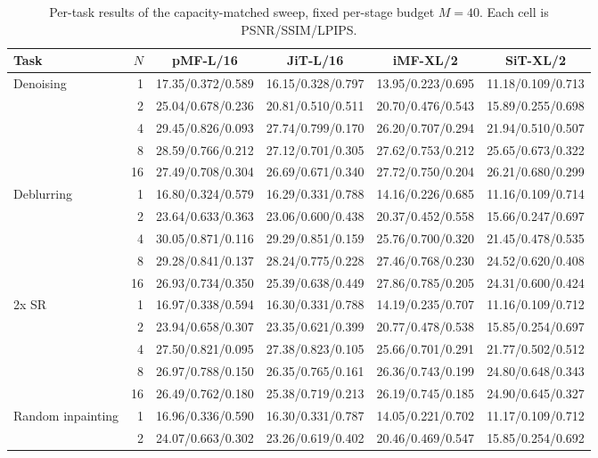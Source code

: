 \begin{table}[t]
\centering
\scriptsize
\setlength{\tabcolsep}{3pt}
\caption{Per-task results of the capacity-matched sweep, fixed per-stage budget $M = 40$. Each cell is PSNR/SSIM/LPIPS.}
\label{tab:capacity_fixedM_tasks}
\begin{tabular}{lrcccc}
\toprule
Task & $N$ & pMF-L/16 & JiT-L/16 & iMF-XL/2 & SiT-XL/2 \\
\midrule
Denoising & 1 & 17.35/0.372/0.589 & 16.15/0.328/0.797 & 13.95/0.223/0.695 & 11.18/0.109/0.713 \\
 & 2 & 25.04/0.678/0.236 & 20.81/0.510/0.511 & 20.70/0.476/0.543 & 15.89/0.255/0.698 \\
 & 4 & 29.45/0.826/0.093 & 27.74/0.799/0.170 & 26.20/0.707/0.294 & 21.94/0.510/0.507 \\
 & 8 & 28.59/0.766/0.212 & 27.12/0.701/0.305 & 27.62/0.753/0.212 & 25.65/0.673/0.322 \\
 & 16 & 27.49/0.708/0.304 & 26.69/0.671/0.340 & 27.72/0.750/0.204 & 26.21/0.680/0.299 \\
\midrule
Deblurring & 1 & 16.80/0.324/0.579 & 16.29/0.331/0.788 & 14.16/0.226/0.685 & 11.16/0.109/0.714 \\
 & 2 & 23.64/0.633/0.363 & 23.06/0.600/0.438 & 20.37/0.452/0.558 & 15.66/0.247/0.697 \\
 & 4 & 30.05/0.871/0.116 & 29.29/0.851/0.159 & 25.76/0.700/0.320 & 21.45/0.478/0.535 \\
 & 8 & 29.28/0.841/0.137 & 28.24/0.775/0.228 & 27.46/0.768/0.230 & 24.52/0.620/0.408 \\
 & 16 & 26.93/0.734/0.350 & 25.39/0.638/0.449 & 27.86/0.785/0.205 & 24.31/0.600/0.424 \\
\midrule
2x SR & 1 & 16.97/0.338/0.594 & 16.30/0.331/0.788 & 14.19/0.235/0.707 & 11.16/0.109/0.712 \\
 & 2 & 23.94/0.658/0.307 & 23.35/0.621/0.399 & 20.77/0.478/0.538 & 15.85/0.254/0.697 \\
 & 4 & 27.50/0.821/0.095 & 27.38/0.823/0.105 & 25.66/0.701/0.291 & 21.77/0.502/0.512 \\
 & 8 & 26.97/0.788/0.150 & 26.35/0.765/0.161 & 26.36/0.743/0.199 & 24.80/0.648/0.343 \\
 & 16 & 26.49/0.762/0.180 & 25.38/0.719/0.213 & 26.19/0.745/0.185 & 24.90/0.645/0.327 \\
\midrule
Random inpainting & 1 & 16.96/0.336/0.590 & 16.30/0.331/0.787 & 14.05/0.221/0.702 & 11.17/0.109/0.712 \\
 & 2 & 24.07/0.663/0.302 & 23.26/0.619/0.402 & 20.46/0.469/0.547 & 15.85/0.254/0.692 \\

\end{tabular}
\end{table}
